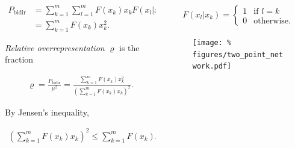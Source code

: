 \begin{frame}{}

    \begin{columns}
      \begin{column}{.5\textwidth}
        \minipage[c][0.85\textheight][s]{\columnwidth}

        \begin{align*}
          P_{\text{bidir}} &= \sum_{k=1}^m \sum_{l=1}^m F(x_k) x_k %
                             F(x_l | x_k) x_l \\ %
                           &= \sum_{k=1}^m F(x_k) x_k^2 .
        \end{align*}


        \textit{Relative overrepresentation} $\varrho$ is the fraction

        \begin{align*}
          \varrho = \frac{P_{\text{bidir}}}{\mu^2} = %
          \frac{\sum_{k=1}^m F(x_k) x_k^2 }%
               {\left(\sum_{k=1}^m F(x_k) x_k\right)^2}.
        \end{align*}

        By Jensen's inequality,

        \begin{align*}
          \left(\sum_{k=1}^m F(x_k) x_k\right)^2 \leq %
          \sum_{k=1}^m F(x_k) x_k^2  \quad \text{and thus}%
          \quad \varrho \geq 1.
        \end{align*}	

        
        \endminipage      
      \end{column}
      \begin{column}{.5\textwidth}
        \minipage[c][0.85\textheight][s]{\columnwidth}

        \begin{align*}
          F(x_l | x_k) = %
          \begin{cases}%
            1 & \text{if $l = k$} \\%
            0 & \text{otherwise.}
          \end{cases}
        \end{align*}

      
        \begin{figure}
          \centering
          \texttt{[image: \%
            figures/two\_point\_network.pdf]} %
        \end{figure}

        \vspace{1.25cm}
        
        \endminipage
                
      \end{column}
      
    \end{columns}
    

\end{frame}



